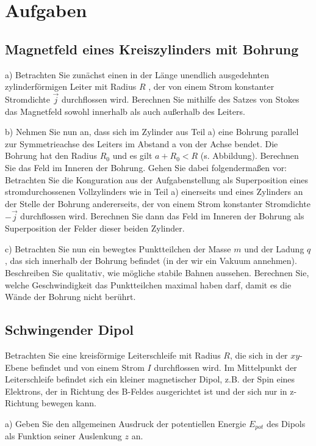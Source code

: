 \section{Aufgaben}

\subsection{Magnetfeld eines Kreiszylinders mit Bohrung}

a) Betrachten Sie zunächst einen in der Länge unendlich ausgedehnten zylinderförmigen Leiter
mit Radius $R$ , der von einem Strom konstanter Stromdichte $\vec{j}$ durchflossen wird. Berechnen
Sie mithilfe des Satzes von Stokes das Magnetfeld sowohl innerhalb als auch außerhalb des
Leiters.

\noindent b) Nehmen Sie nun an, dass sich im Zylinder aus Teil a) eine Bohrung parallel zur Symmetrieachse des Leiters im Abstand a von der Achse bendet. Die Bohrung hat den Radius $R_0$ und es gilt $a + R_0 < R$ (s. Abbildung). Berechnen Sie das Feld im Inneren der Bohrung. Gehen Sie dabei folgendermaßen vor:
Betrachten Sie die Konguration aus der Aufgabenstellung als Superposition eines stromdurchossenen Vollzylinders wie in Teil a) einerseits und eines Zylinders an der Stelle der Bohrung andererseits, der von einem Strom konstanter Stromdichte $− \vec{j}$ durchflossen wird.
Berechnen Sie dann das Feld im Inneren der Bohrung als Superposition der Felder dieser beiden Zylinder.

\noindent c) Betrachten Sie nun ein bewegtes Punktteilchen der Masse $m$ und der Ladung $q$, das sich
innerhalb der Bohrung befindet (in der wir ein Vakuum annehmen). Beschreiben Sie qualitativ, wie mögliche stabile Bahnen aussehen. Berechnen Sie, welche Geschwindigkeit das Punktteilchen maximal haben darf, damit es die Wände der Bohrung nicht berührt.


\subsection{Schwingender Dipol}

Betrachten Sie eine kreisförmige Leiterschleife mit Radius $R$, die sich in der $xy$-Ebene befindet und von einem Strom $I$ durchflossen wird. Im Mittelpunkt der Leiterschleife befindet sich ein kleiner magnetischer Dipol, z.B. der Spin eines Elektrons, der in Richtung des B-Feldes ausgerichtet ist und der sich nur in z-Richtung bewegen kann.

\noindent a) Geben Sie den allgemeinen Ausdruck der potentiellen Energie $E_{pot}$ des Dipols als Funktion seiner Auslenkung $z$ an.

